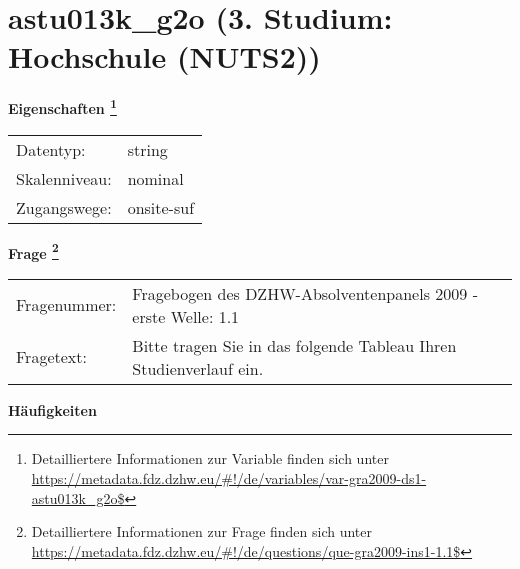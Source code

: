 
    \setcounter{footnote}{0}

    \vspace*{-1.8cm}
	\section{astu013k\_g2o (3. Studium: Hochschule (NUTS2))}
	\label{section:astu013k_g2o}



    \vspace*{0.5cm}
    \noindent\textbf{Eigenschaften
	\footnote{Detailliertere Informationen zur Variable finden sich unter
		\url{https://metadata.fdz.dzhw.eu/\#!/de/variables/var-gra2009-ds1-astu013k_g2o$}}}\\
	\begin{tabularx}{\hsize}{@{}lX}
	Datentyp: & string \\
	Skalenniveau: & nominal \\
	Zugangswege: &
	  onsite-suf
 \\
    \end{tabularx}



				\vspace*{0.5cm}
                \noindent\textbf{Frage
	                \footnote{Detailliertere Informationen zur Frage finden sich unter
		              \url{https://metadata.fdz.dzhw.eu/\#!/de/questions/que-gra2009-ins1-1.1$}}}\\
				\begin{tabularx}{\hsize}{@{}lX}
					Fragenummer: &
					  Fragebogen des DZHW-Absolventenpanels 2009 - erste Welle:
					  1.1
 \\
					Fragetext: & Bitte tragen Sie in das folgende Tableau Ihren Studienverlauf ein. \\
				\end{tabularx}





        		\vspace*{0.5cm}
                \noindent\textbf{Häufigkeiten}


